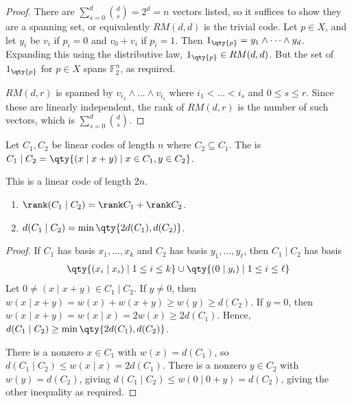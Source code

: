 \begin{proof}
    There are $\sum_{s=0}^d \binom{d}{s} = 2^d = n$ vectors listed, so it suffices to show they are a spanning set, or equivalently $RM(d,d)$ is the trivial code.
    Let $p \in X$, and let $y_i$ be $v_i$ if $p_i = 0$ and $v_0 + v_i$ if $p_i = 1$.
    Then $1_{\qty{p}} = y_1 \wedge \dots \wedge y_d$.
    Expanding this using the distributive law, $1_{\qty{p}} \in RM(d,d)$.
    But the set of $1_{\qty{p}}$ for $p \in X$ spans $\mathbb F_2^n$, as required.

    $RM(d,r)$ is spanned by $v_{i_1} \wedge \dots \wedge v_{i_s}$ where $i_1 < \dots < i_s$ and $0 \leq s \leq r$.
    Since these are linearly independent, the rank of $RM(d,r)$ is the number of such vectors, which is $\sum_{s=0}^d \binom{d}{s}$.
\end{proof}

\begin{definition}
    Let $C_1, C_2$ be linear codes of length $n$ where $C_2 \subseteq C_1$.
    The  is $C_1 \mid C_2 = \qty{(x \mid x + y) \mid x \in C_1, y \in C_2}$.
\end{definition}

This is a linear code of length $2n$.

\begin{lemma}
    \begin{enumerate}
        \item $\rank (C_1 \mid C_2) = \rank C_1 + \rank C_2$.
        \item $d(C_1 \mid C_2) = \min \qty{2d(C_1), d(C_2)}$.
    \end{enumerate}
\end{lemma}

\begin{proof}
    If $C_1$ has basis $x_1, \dots, x_k$ and $C_2$ has basis $y_1, \dots, y_\ell$, then $C_1 \mid C_2$ has basis
    \begin{align*}
        \qty{(x_i \mid x_i) \mid 1 \leq i \leq k} \cup \qty{(0 \mid y_i) \mid 1 \leq i \leq \ell}
    \end{align*}
    Let $0 \neq (x \mid x + y) \in C_1 \mid C_2$.
    If $y \neq 0$, then $w(x \mid x + y) = w(x) + w(x + y) \geq w(y) \geq d(C_2)$.
    If $y = 0$, then $w(x \mid x + y) = w(x \mid x) = 2w(x) \geq 2d(C_1)$.
    Hence, $d(C_1 \mid C_2) \geq \min\qty{2d(C_1), d(C_2)}$.

    There is a nonzero $x \in C_1$ with $w(x) = d(C_1)$, so $d(C_1 \mid C_2) \leq w(x \mid x) = 2d(C_1)$.
    There is a nonzero $y \in C_2$ with $w(y) = d(C_2)$, giving $d(C_1 \mid C_2) \leq w(0 \mid 0 + y) = d(C_2)$, giving the other inequality as required.
\end{proof}

